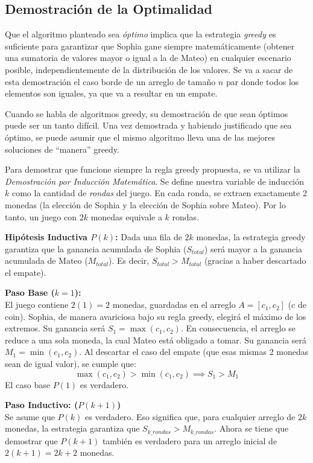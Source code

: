 \subsection{Demostración de la Optimalidad}

Que el algoritmo planteado sea \textit{óptimo} implica que la estrategia \textit{greedy} es suficiente para garantizar que Sophia gane siempre matemáticamente (obtener una sumatoria de valores mayor o igual a la de Mateo) en cualquier escenario posible, independientemente de la distribución de los valores. 
Se va a sacar de esta demostración el caso borde de un arreglo de tamaño $n$ par donde todos los elementos son iguales, ya que va a resultar en un empate. 

Cuando se habla de algoritmos greedy, su demostración de que sean óptimos puede ser un tanto difícil. Una vez demostrada y habiendo justificado que sea óptimo, se puede asumir que el mismo algoritmo lleva una de las mejores soluciones de ``manera'' greedy.

Para demostrar que funcione siempre la regla greedy propuesta, se va utilizar la \textit{Demostración por Inducción Matemática}. Se define nuestra variable de inducción $k$ como la cantidad de \textit{rondas} del juego. En cada ronda, se extraen exactamente 2 monedas (la elección de Sophia y la elección de Sophia sobre Mateo). Por lo tanto, un juego con $2k$ monedas equivale a $k$ rondas.

\textbf{Hipótesis Inductiva $P(k)$:} 
Dada una fila de $2k$ monedas, la estrategia greedy garantiza que la ganancia acumulada de Sophia ($S_{total}$) será mayor  a la ganancia acumulada de Mateo ($M_{total}$). Es decir, $S_{total} > M_{total}$ (gracias a haber descartado el empate).

\vspace{1ex}
\noindent\textbf{Paso Base ($k = 1$):} \\
El juego contiene $2(1) = 2$ monedas, guardadas en el arreglo $A = [c_1, c_2]$ (c de coin). 
Sophia, de manera avariciosa bajo su regla greedy, elegirá el máximo de los extremos. Su ganancia será $S_1 = \max(c_1, c_2)$.
En consecuencia, el arreglo se reduce a una sola moneda, la cual Mateo está obligado a tomar. Su ganancia será $M_1 = \min(c_1, c_2)$.
Al descartar el caso del empate (que esas mismas 2 monedas sean de igual valor), se cumple que:
\[ \max(c_1, c_2) > \min(c_1, c_2) \implies S_1 > M_1 \]
El caso base $P(1)$ es verdadero.

\vspace{1ex}
\noindent\textbf{Paso Inductivo: ($P(k + 1)$)} \\
Se asume que $P(k)$ es verdadero. Eso significa que, para cualquier arreglo de $2k$ monedas, la estrategia garantiza que $S_{k\_rondas} > M_{k\_rondas}$.
Ahora se tiene que demostrar que $P(k+1)$ también es verdadero para un arreglo inicial de $2(k+1) = 2k + 2$ monedas.

